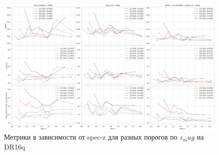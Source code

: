 \documentclass[fleqn,usenatbib]{mnras}
\begin{document}
\begin{landscape}
\begin{figure}
    \centering
    \includegraphics[width=0.9\linewidth]{images/metrics-adv-zspec-x-zmag-dr16q.png}
    \caption{Метрики в зависимости от spec-z для разных порогов по $z_mag$ на DR16q}
    \label{fig:my_label}
\end{figure}
\end{landscape}
\end{document}

